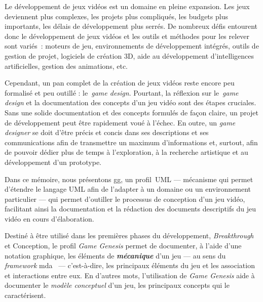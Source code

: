 \begin{introduction}



Le développement de jeux vidéos est un domaine en pleine expansion.
%
Les jeux deviennent plus complexes, les projets plus compliqués, les
budgets plus importants, les d\'elais de développement plus serr\'es.
%
De nombreux défis entourent donc le développement de jeux vidéos et
les outils et méthodes pour les relever sont variés~: moteurs de jeu,
environnements de développement intégrés, outils de gestion de projet,
logiciels de création 3D, aide au développement d'intelligences
artificielles, gestion des animations, etc.

Cependant, un pan complet de la création de jeux vidéos reste encore
peu formalisé et peu outillé : le~\emph{game design}.
%
Pourtant, la réflexion sur le~\emph{game design} et la documentation des concepts d'un jeu vidéo sont des étapes cruciales.
%
Sans une solide documentation et des concepts formul\'es de fa\c{c}on claire, un
projet de développement peut être rapidement voué à l'échec.
%
En outre, un \emph{game designer} se doit d'être précis et concis dans ses
descriptions et ses communications afin de transmettre un maximum
d'informations et, surtout, afin de pouvoir dédier plus de temps à l'exploration, à
la recherche artistique et au développement d'un prototype.


Dans ce mémoire, nous présentons \gls{gg}, un profil~UML --- mécanisme qui permet d'étendre le langage UML afin de l'adapter à un domaine ou un environnement particulier --- qui permet d'outiller le processus de conception d'un jeu vidéo, facilitant ainsi la documentation et la rédaction des documents descriptifs du jeu vidéo en cours d'élaboration.

\begin{comment}
\gt{Ci-bas: il vaut mieux ne pas parler <<d'acc\'el\'eration>>, car tu
n'apportes aucune preuve/justification que cela permet d'aller plus
rapidement.}
\end{comment}


%
Destiné à être utilisé dans les premières phases du développement,
\emph{Breakthrough} et Conception, le profil \emph{Game Genesis}
permet de documenter, à l'aide d'une notation graphique, les
\'el\'ements de \emph{\bf mécanique} d'un jeu --- au sens du
\emph{framework} \gls{mda}~\cite{MDA_formal} --- c'est-\`a-dire,
les principaux éléments du jeu et les association et interactions
entre eux.
%
En d'autres mots, l'utilisation de \emph{Game Genesis} aide \`a
documenter le \emph{mod\`ele conceptuel} d'un jeu, les principaux
concepts qui le caract\'erisent.



\end{introduction}

